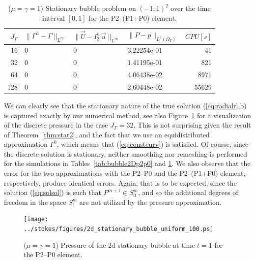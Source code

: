 \documentclass[a4paper,11pt,onecolumn]{article}
\newcommand{\errorXx}{\|\Gamma^h - \Gamma\|_{L^\infty}}
\newcommand{\errorUu}[1]{\|\vec U - I^h_{#1}\,\vec u\|_{L^\infty}}
\newcommand{\LerrorPp}{\|P - p\|_{L^2(\Omega_T)}}
\begin{document}
\begin{table}
 \center
\begin{tabular}{rlllr}
\hline
$J_\Gamma$ & $\errorXx$ & $\errorUu2$ & $\LerrorPp$ & $CPU[s]$ \\
\hline
 16 & 0 & 0 & 3.22254e-01 &    41 \\
 32 & 0 & 0 & 1.41195e-01 &   821 \\
 64 & 0 & 0 & 4.06438e-02 &  8971 \\
128 & 0 & 0 & 2.60448e-02 & 55629 \\
\hline
\end{tabular}
\caption{($\mu=\gamma=1$) Stationary bubble problem on $(-1,1)^2$ over the time
interval $[0,1]$ for the P2--(P1+P0) element.}
\label{tab:bubble2Dp2p1p0}
\end{table}
We can clearly see that the stationary nature of the true solution
(\ref{eq:radialr},b) is captured exactly by our numerical method,
see also Figure~\ref{fig:2d_stationary_bubble} for a visualization of the
discrete pressure in the case $J_\Gamma = 32$. This is not surprising given the
result of Theorem~\ref{thm:stat2}, and the fact that we use an equidistributed
approximation $\Gamma^0$, which means that (\ref{eq:constcurv}) is satisfied.
Of course, since the discrete solution is stationary, neither smoothing nor
remeshing is performed for the simulations in Tables~\ref{tab:bubble2Dp2p0} and
\ref{tab:bubble2Dp2p1p0}. We also observe that the error for the two
approximations with the P2--P0 and the P2--(P1+P0) element, respectively,
produce identical errors. Again, that is to be expected, since the solution
(\ref{eq:solsol}) is such that $P^{m+1} \in S^m_0$, and so the additional
degrees of freedom in the space $S^m_1$ are not utilized by the pressure
approximation.
\begin{figure}[htbp]
\centering
\texttt{[image: ../stokes/figures/2d\_stationary\_bubble\_uniform\_100.ps]}
\caption{($\mu=\gamma=1$) Pressure of the 2d stationary bubble at time $t=1$
for the P2--P0 element.}
\label{fig:2d_stationary_bubble}
\end{figure}
\end{document}
